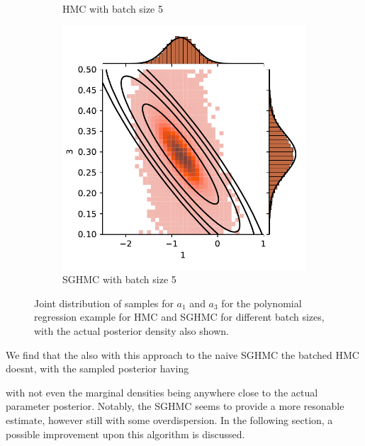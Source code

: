 \begin{figure}[htbp]
\begin{subfigure}[b]{0.4\textwidth}
        \caption{HMC with batch size 5}
    \end{subfigure}
    \begin{subfigure}[b]{0.4\textwidth}
        \centering
        \includegraphics[width=\textwidth]{Figures/simulated_joint_SGHMC_5.pdf} 
        \caption{SGHMC with batch size 5}
    \end{subfigure}
    \caption{Joint distribution of samples for $a_1$ and $a_3$ for the polynomial regression example for HMC and SGHMC for different batch sizes, with the actual posterior density also shown.}
    \label{fig:simulated_joint_comp}
\end{figure}
We find that the also with this approach to the naive SGHMC the batched HMC doesnt, with the sampled posterior having 

with not even the marginal densities being anywhere close to the actual parameter posterior. Notably, the SGHMC seems to provide a more resonable estimate, however still with some overdispersion. In the following section, a possible improvement upon this algorithm is discussed.

